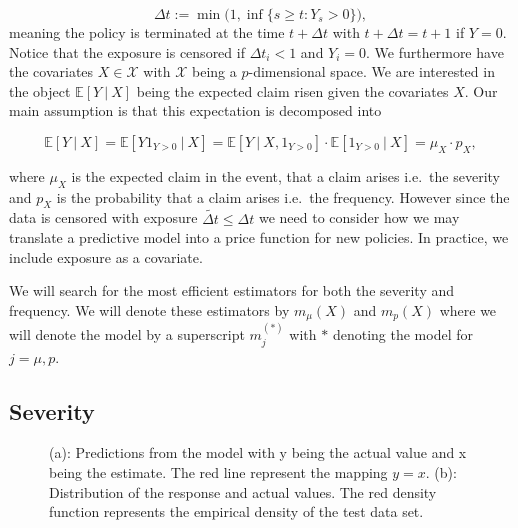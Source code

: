 \documentclass[
]{article}
\begin{document}
\[
\Delta t := \min\big(1,\inf\{s\ge t : Y_s>0\}\big),
\] meaning the policy is terminated at the time \(t+\Delta t\) with
\(t+\Delta t=t+1\) if \(Y=0\). Notice that the exposure is censored if
\(\Delta t_i<1\) and \(Y_i=0\). We furthermore have the covariates
\(X\in \mathcal X\) with \(\mathcal X\) being a \(p\)-dimensional space.
We are interested in the object \(\mathbb E[Y\ \vert\ X]\) being the
expected claim risen given the covariates \(X\). Our main assumption is
that this expectation is decomposed into

\[
\mathbb E[Y\ \vert\ X]=\mathbb E[Y1_{Y>0}\ \vert\ X]=\mathbb E[Y\ \vert\ X,1_{Y>0}]\cdot \mathbb E[1_{Y>0}\ \vert\ X]=\mu_X\cdot p_X,
\]

where \(\mu_X\) is the expected claim in the event, that a claim arises
i.e.~the severity and \(p_X\) is the probability that a claim arises
i.e.~the frequency. However since the data is censored with exposure
\(\tilde{\Delta t}\le \Delta t\) we need to consider how we may
translate a predictive model into a price function for new policies. In
practice, we include exposure as a covariate.

We will search for the most efficient estimators for both the severity
and frequency. We will denote these estimators by \(m_\mu(X)\) and
\(m_p(X)\) where we will denote the model by a superscript \(m^{(*)}_j\)
with \(*\) denoting the model for \(j=\mu,p\).

\hypertarget{severity}{%
\subsection{Severity}\label{severity}}

\begin{figure}[h]
    \centering
    \qquad
    \caption{(a): Predictions from the model with y being the actual value and x being the estimate. The red line represent the mapping $y=x$. (b): Distribution of the response and actual values. The red density function represents the empirical density of the test data set.}
\end{figure}
\end{document}
